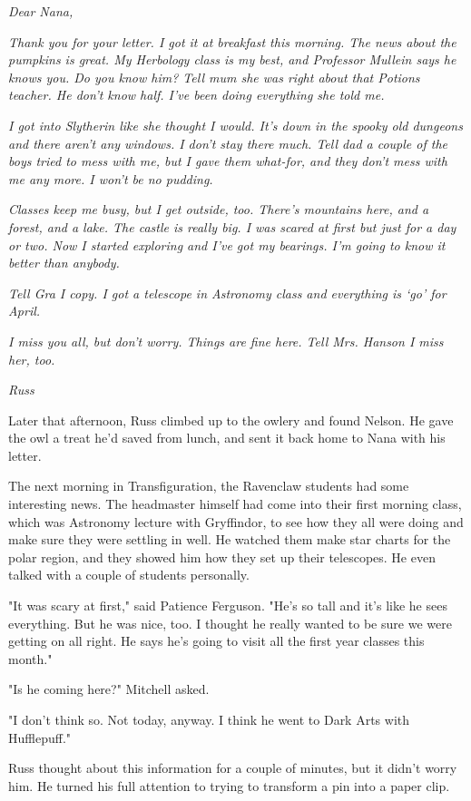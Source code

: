 \documentclass[a4paper,11pt]{article}
\begin{document}
\emph{Dear Nana,}

\emph{Thank you for your letter. I got it at breakfast this morning. The news about the pumpkins is great. My Herbology class is my best, and Professor Mullein says he knows you. Do you know him? Tell mum she was right about that Potions teacher. He don't know half. I've been doing everything she told me.}

\emph{I got into Slytherin like she thought I would. It's down in the spooky old dungeons and there aren't any windows. I don't stay there much. Tell dad a couple of the boys tried to mess with me, but I gave them what-for, and they don't mess with me any more. I won't be no pudding.}

\emph{Classes keep me busy, but I get outside, too. There's mountains here, and a forest, and a lake. The castle is really big. I was scared at first but just for a day or two. Now I started exploring and I've got my bearings. I'm going to know it better than anybody.}

\emph{Tell Gra I copy. I got a telescope in Astronomy class and everything is `go' for April.}

\emph{I miss you all, but don't worry. Things are fine here. Tell Mrs. Hanson I miss her, too.}

\emph{Russ}

Later that afternoon, Russ climbed up to the owlery and found Nelson. He gave the owl a treat he'd saved from lunch, and sent it back home to Nana with his letter.

The next morning in Transfiguration, the Ravenclaw students had some interesting news. The headmaster himself had come into their first morning class, which was Astronomy lecture with Gryffindor, to see how they all were doing and make sure they were settling in well. He watched them make star charts for the polar region, and they showed him how they set up their telescopes. He even talked with a couple of students personally.

"It was scary at first," said Patience Ferguson. "He's so tall and it's like he sees everything. But he was nice, too. I thought he really wanted to be sure we were getting on all right. He says he's going to visit all the first year classes this month."

"Is he coming here?" Mitchell asked.

"I don't think so. Not today, anyway. I think he went to Dark Arts with Hufflepuff."

Russ thought about this information for a couple of minutes, but it didn't worry him. He turned his full attention to trying to transform a pin into a paper clip.
\end{document}
